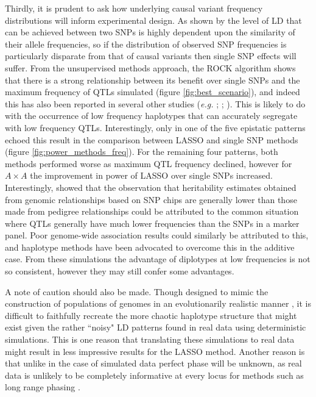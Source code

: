 Thirdly, it is prudent to ask how underlying causal variant frequency distributions will inform experimental design. As shown by \citet{Schork2000} the level of LD that can be achieved between two SNPs is highly dependent upon the similarity of their allele frequencies, so if the distribution of observed SNP frequencies is particularly disparate from that of causal variants then single SNP effects will suffer. From the unsupervised methods approach, the ROCK algorithm shows that there is a strong relationship between its benefit over single SNPs and the maximum frequency of QTLs simulated (figure \ref{fig:best_scenario}), and indeed this has also been reported in several other studies (\emph{e.g.} \citealp{Durrant2004}; \citealp{Browning2007}; \citealp{Schaid2004}). This is likely to do with the occurrence of low frequency haplotypes that can accurately segregate with low frequency QTLs. Interestingly, only in one of the five epistatic patterns echoed this result in the comparison between LASSO and single SNP methods (figure \ref{fig:power_methods_freq}). For the remaining four patterns, both methods performed worse as maximum QTL frequency declined, however for $A \times A$ the improvement in power of LASSO over single SNPs increased. Interestingly, \citet{Yang2010} showed that the observation that heritability estimates obtained from genomic relationships based on SNP chips are generally lower than those made from pedigree relationships could be attributed to the common situation where QTLs generally have much lower frequencies than the SNPs in a marker panel. Poor genome-wide association results could similarly be attributed to this, and haplotype methods have been advocated to overcome this in the additive case. From these simulations the advantage of diplotypes at low frequencies is not so consistent, however they may still confer some advantages.

A note of caution should also be made. Though designed to mimic the construction of populations of genomes in an evolutionarily realistic manner \citep{Hoggart2007}, it is difficult to faithfully recreate the more chaotic haplotype structure that might exist given the rather ``noisy" LD patterns found in real data using deterministic simulations. This is one reason that translating these simulations to real data might result in less impressive results for the LASSO method. Another reason is that unlike in the case of simulated data perfect phase will be unknown, as real data is unlikely to be completely informative at every locus for methods such as long range phasing \citep{Kong2008}.

